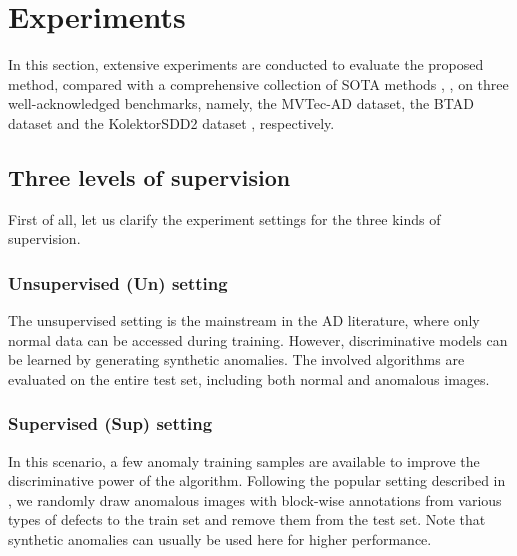 






\section{Experiments}
\label{sec:experiments}

In this section, extensive experiments are conducted to evaluate the proposed method,
compared with a comprehensive collection of SOTA methods \citep{roth2022towards,
zavrtanik2021draem, deng2022anomaly}, \citep{ristea2022self, liu2023diversity,
Liu_2023_CVPR, zhang2023destseg, lei2023pyramidflow, gudovskiy2022cflow, Tien_2023_CVPR,
zhang2022prototypical, yao2022explicit, pang2021explainable, ding2022catching}, on three
well-acknowledged benchmarks, namely, the MVTec-AD \citep{bergmann2019mvtec} dataset, the BTAD
\citep{mishra2021vt} dataset and the KolektorSDD2 dataset
\citep{bovzivc2021mixed-KolektorSDD2}, respectively.

\subsection{Three levels of supervision}
\label{subsec:Experimental_settings}

First of all, let us clarify the experiment settings for the three kinds of supervision. 

\subsubsection{Unsupervised (Un) setting} 
The unsupervised setting is the mainstream in the AD literature, where only normal data
can be accessed during training. However, discriminative models can be learned by
generating synthetic anomalies. The involved algorithms are evaluated on the entire test
set, including both normal and anomalous images. 

\subsubsection{Supervised (Sup) setting} 
In this scenario, a few anomaly training samples are available to improve the
discriminative power of the algorithm. Following the popular setting described in
\citep{zhang2022prototypical}, we randomly draw  anomalous images with
block-wise annotations from various types of defects to the train set and remove them from
the test set. Note that synthetic anomalies can usually be used here for higher
performance. 

